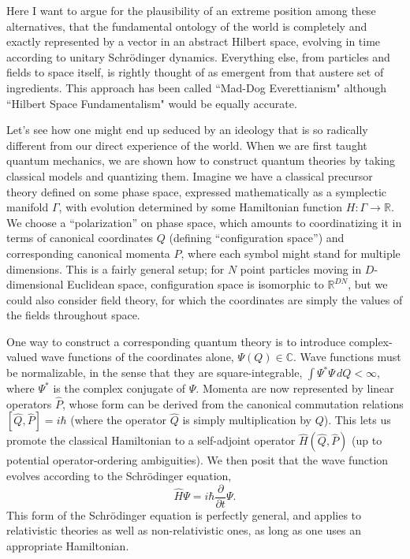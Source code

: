 \documentclass[12pt,english]{article}
\newcommand{\be}{\begin{equation}}
\newcommand{\ee}{\end{equation}}
\begin{document}
Here I want to argue for the plausibility of an extreme position among these alternatives, that the fundamental ontology of the world is completely and exactly represented by a vector in an abstract Hilbert space, evolving in time according to unitary Schr\"odinger dynamics.
Everything else, from particles and fields to space itself, is rightly thought of as emergent from that austere set of ingredients. 
This approach has been called ``Mad-Dog Everettianism" \citep{Carroll:2018rhc} although ``Hilbert Space Fundamentalism" would be equally accurate.

Let's see how one might end up seduced by an ideology that is so radically different from our direct experience of the world.
When we are first taught quantum mechanics, we are shown how to construct quantum theories by taking classical models and quantizing them.
Imagine we have a classical precursor theory defined on some phase space, expressed mathematically as a symplectic manifold $\Gamma$, with evolution determined by some Hamiltonian function $H: \Gamma \rightarrow \mathbb{R}$.
We choose a ``polarization'' on phase space, which amounts to coordinatizing it in terms of canonical coordinates $Q$ (defining ``configuration space'') and corresponding canonical momenta $P$, where each symbol might stand for multiple dimensions.
This is a fairly general setup; for $N$ point particles moving in $D$-dimensional Euclidean space, configuration space is isomorphic to $\mathbb{R}^{DN}$, but we could also consider field theory, for which the coordinates are simply the values of the fields throughout space.

One way to construct a corresponding quantum theory is to introduce complex-valued wave functions of the coordinates alone, $\Psi(Q) \in \mathbb{C}$.
Wave functions must be normalizable, in the sense that they are square-integrable, $\int \Psi^*\Psi \,dQ <\infty$, where $\Psi^*$ is the complex conjugate of $\Psi$.
Momenta are now represented by linear operators $\hat{P}$, whose form can be derived from the canonical commutation relations $[\hat{Q},\hat{P}]=i\hbar$ (where the operator $\hat{Q}$ is simply multiplication by $Q$).
This lets us promote the classical Hamiltonian to a self-adjoint operator $\hat{H}(\hat{Q}, \hat{P})$ (up to potential operator-ordering ambiguities).
We then posit that the wave function evolves according to the Schr\"odinger equation,
\be
  \hat{H}\Psi = i\hbar \frac{\partial}{\partial t}\Psi.
\ee
This form of the Schr\"odinger equation is perfectly general, and applies to relativistic theories as well as non-relativistic ones, as long as one uses an appropriate Hamiltonian.
\end{document}
